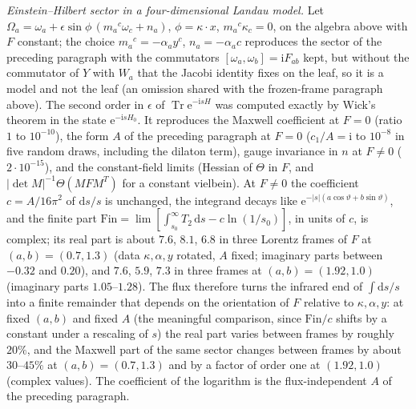 \emph{Einstein--Hilbert sector in a four-dimensional Landau model.} Let \(\Omega_a=\omega_a+\epsilon\sin\phi\,(m_a{}^c\omega_c+n_a)\), \(\phi=\kappa\cdot x\), \(m_a{}^c\kappa_c=0\), on the algebra above with \(F\) constant; the choice \(m_a{}^c=-\alpha_ay^c\), \(n_a=-\alpha_a c\) reproduces the sector of the preceding paragraph with the commutators \([\omega_a,\omega_b]=\mathrm iF_{ab}\) kept, but without the commutator of \(Y\) with \(W_a\) that the Jacobi identity fixes on the leaf, so it is a model and not the leaf (an omission shared with the frozen-frame paragraph above). The second order in \(\epsilon\) of \(\operatorname{Tr}\mathrm e^{-\mathrm isH}\) was computed exactly by Wick's theorem in the state \(\mathrm e^{-\mathrm isH_0}\). It reproduces the Maxwell coefficient at \(F=0\) (ratio \(1\) to \(10^{-10}\)), the form \(A\) of the preceding paragraph at \(F=0\) (\(c_1/A=\mathrm i\) to \(10^{-8}\) in five random draws, including the dilaton term), gauge invariance in \(n\) at \(F\ne0\) (\(2\cdot10^{-15}\)), and the constant-field limits (Hessian of \(\Theta\) in \(F\), and \(|\det M|^{-1}\Theta(MFM^T)\) for a constant vielbein). At \(F\ne0\) the coefficient \(c=A/16\pi^2\) of \(\mathrm ds/s\) is unchanged, the integrand decays like \(\mathrm e^{-|s|(a\cos\vartheta+b\sin\vartheta)}\), and the finite part \(\mathrm{Fin}=\lim[\int_{s_0}^\infty T_2\,\mathrm ds-c\ln(1/s_0)]\), in units of \(c\), is complex; its real part is about \(7.6\), \(8.1\), \(6.8\) in three Lorentz frames of \(F\) at \((a,b)=(0.7,1.3)\) (data \(\kappa,\alpha,y\) rotated, \(A\) fixed; imaginary parts between \(-0.32\) and \(0.20\)), and \(7.6\), \(5.9\), \(7.3\) in three frames at \((a,b)=(1.92,1.0)\) (imaginary parts \(1.05\)--\(1.28\)). The flux therefore turns the infrared end of \(\int\mathrm ds/s\) into a finite remainder that depends on the orientation of \(F\) relative to \(\kappa,\alpha,y\): at fixed \((a,b)\) and fixed \(A\) (the meaningful comparison, since \(\mathrm{Fin}/c\) shifts by a constant under a rescaling of \(s\)) the real part varies between frames by roughly \(20\%\), and the Maxwell part of the same sector changes between frames by about \(30\)--\(45\%\) at \((a,b)=(0.7,1.3)\) and by a factor of order one at \((1.92,1.0)\) (complex values). The coefficient of the logarithm is the flux-independent \(A\) of the preceding paragraph.



